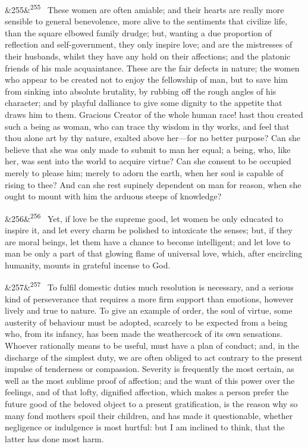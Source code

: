 \documentclass[12pt]{article}
\newcommand{\para}[1][]{\par\noindent\ifx&#1&\else\textsuperscript{\footnotesize #1}~\fi}
\begin{document}
\para[255] These women are often amiable; and their hearts are really more sensible to general benevolence, more alive to the sentiments that civilize life, than the square elbowed family drudge; but, wanting a due proportion of reflection and self-government, they only inspire love; and are the mistresses of their husbands, whilst they have any hold on their affections; and the platonic friends of his male acquaintance. These are the fair defects in nature; the women who appear to be created not to enjoy the fellowship of man, but to save him from sinking into absolute brutality, by rubbing off the rough angles of his character; and by playful dalliance to give some dignity to the appetite that draws him to them. Gracious Creator of the whole human race! hast thou created such a being as woman, who can trace thy wisdom in thy works, and feel that thou alone art by thy nature, exalted above her---for no better purpose? Can she believe that she was only made to submit to man her equal; a being, who, like her, was sent into the world to acquire virtue? Can she consent to be occupied merely to please him; merely to adorn the earth, when her soul is capable of rising to thee? And can she rest supinely dependent on man for reason, when she ought to mount with him the arduous steeps of knowledge?

\para[256] Yet, if love be the supreme good, let women be only educated to inspire it, and let every charm be polished to intoxicate the senses; but, if they are moral beings, let them have a chance to become intelligent; and let love to man be only a part of that glowing flame of universal love, which, after encircling humanity, mounts in grateful incense to God.

\para[257] To fulfil domestic duties much resolution is necessary, and a serious kind of perseverance that requires a more firm support than emotions, however lively and true to nature. To give an example of order, the soul of virtue, some austerity of behaviour must be adopted, scarcely to be expected from a being who, from its infancy, has been made the weathercock of its own sensations. Whoever rationally means to be useful, must have a plan of conduct; and, in the discharge of the simplest duty, we are often obliged to act contrary to the present impulse of tenderness or compassion. Severity is frequently the most certain, as well as the most sublime proof of affection; and the want of this power over the feelings, and of that lofty, dignified affection, which makes a person prefer the future good of the beloved object to a present gratification, is the reason why so many fond mothers spoil their children, and has made it questionable, whether negligence or indulgence is most hurtful: but I am inclined to think, that the latter has done most harm.
\end{document}
